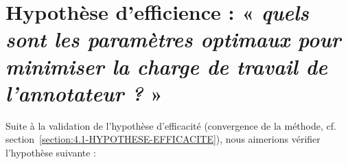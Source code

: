 \section{Hypothèse d'efficience : « \textit{quels sont les paramètres optimaux pour minimiser la charge de travail de l'annotateur ?} »}
\label{section:4.2-HYPOTHESE-EFFICIENCE}


	Suite à la validation de l'hypothèse d'efficacité (convergence de la méthode, cf. section~\ref{section:4.1-HYPOTHESE-EFFICACITE}), nous aimerions vérifier l'hypothèse suivante :

